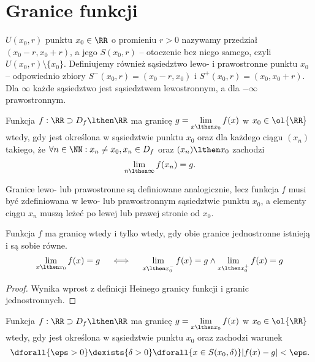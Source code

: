 \documentclass[11pt]{scrartcl}
\begin{document}
    \section{Granice funkcji}
     $U(x_0, r)$ punktu $x_0 \in \RR$ o promieniu $r > 0$ nazywamy przedział $(x_0 - r, x_0 + r)$, a jego  $S(x_0, r)$ -- otoczenie bez niego samego, czyli $U(x_0, r) \setminus \{x_0\}$. Definiujemy również sąsiedztwo lewo- i prawostronne punktu $x_0$ -- odpowiednio zbiory $S^-(x_0, r) = (x_0 - r, x_0)$ i $S^+(x_0, r) = (x_0, x_0 + r)$. Dla $\infty$ każde sąsiedztwo jest sąsiedztwem lewostronnym, a dla $-\infty$ prawostronnym.

    \begin{definition}
        Funkcja $f: \RR \supset D_f \lthen \RR$ ma granicę $g = \lim\limits_{x \lthen x_0} f(x)$ w $x_0 \in \ol{\RR}$ wtedy, gdy jest określona w sąsiedztwie punktu $x_0$ oraz dla każdego ciągu $(x_n)$ takiego, że $\forall n \in \NN : x_n \neq x_0, x_n \in D_f$ oraz $(x_n) \lthen x_0$ zachodzi
        \[ \lim_{n\lthen\infty} f(x_n) = g. \]
    \end{definition}

    Granice lewo- lub prawostronne są definiowane analogicznie, lecz funkcja $f$ musi być zdefiniowana w lewo- lub prawostronnym sąsiedztwie punktu $x_0$, a elementy ciągu $x_n$ muszą leżeć po lewej lub prawej stronie od $x_0$.

    \begin{theorem}
        Funkcja $f$ ma granicę wtedy i tylko wtedy, gdy obie granice jednostronne istnieją i są sobie równe.
        \[ \lim_{x \lthen x_0} f(x) = g \quad\iff\quad \lim_{x \lthen x_0^-} f(x) = g \land \lim_{x \lthen x_0^+} f(x) = g \]
    \end{theorem}
    \begin{proof}
        Wynika wprost z definicji Heinego granicy funkcji i granic jednostronnych.
    \end{proof}

    \begin{definition}
        \label{d:cauchy_lim}
        Funkcja $f: \RR \supset D_f \lthen \RR$ ma granicę $g = \lim\limits_{x \lthen x_0} f(x)$ w $x_0 \in \ol{\RR}$ wtedy, gdy jest określona w sąsiedztwie punktu $x_0$ oraz zachodzi warunek
        \[ \dforall{\eps > 0} \dexists{\delta > 0} \dforall{x \in S(x_0, \delta)} |f(x) - g| < \eps. \]
    \end{definition}
\end{document}
